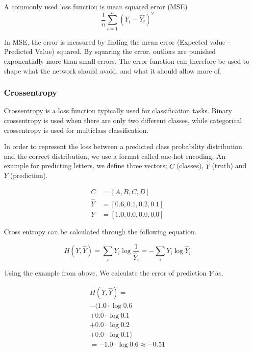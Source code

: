 A commonly used loss function is mean squared error (MSE)
\begin{equation}
    \frac{1}{n} \sum^n_{i=1} (Y_i - \hat{Y_i})^2
\end{equation}

In MSE, the error is measured by finding the mean error (Expected value - Predicted Value) squared. By squaring the error, outliers are punished exponentially more than small errors. The error function can therefore be used to shape what the network should avoid, and what it should allow more of.%

\subsubsection{Crossentropy}
\label{categorical-crossentropy}

Crossentropy is a loss function typically used for classification tasks. Binary crossentropy is used when there are only two different classes, while categorical crossentropy is used for multiclass classification.

In order to represent the loss between a predicted class probability distribution and the correct distribution, we use a format called one-hot encoding. An example for predicting letters, we define three vectors; $C$ (classes), $\hat{Y}$ (truth) and $Y$ (prediction).



\begin{equation} \label{eqn:catcross_ex1}
\begin{split}
    C &= [A, B, C, D] \\
    \hat{Y} &= [0.6, 0.1, 0.2, 0.1] \\
    Y &= [1.0, 0.0, 0.0, 0.0]
\end{split}
\end{equation}

Cross entropy can be calculated through the following equation.

\begin{equation} \label{eqn:catcross_ex2}
    H(Y, \hat{Y}) = \sum_i Y_i \log \frac{1}{\hat{Y}_i} = -\sum_i Y_i \log \hat{Y}_i
\end{equation}

Using the example from above. We calculate the error of prediction $\hat{Y}$ as.

\begin{equation} \label{eqn:catcross_ex3}
\begin{split}
    H(Y, \hat{Y}) = \\
    -( 1.0 \cdot \log 0.6\\
    + 0.0 \cdot \log 0.1\\
    + 0.0 \cdot \log 0.2\\
    + 0.0 \cdot \log 0.1) \\
    = - 1.0 \cdot \log 0.6 \approx -0.51
\end{split}
\end{equation}

